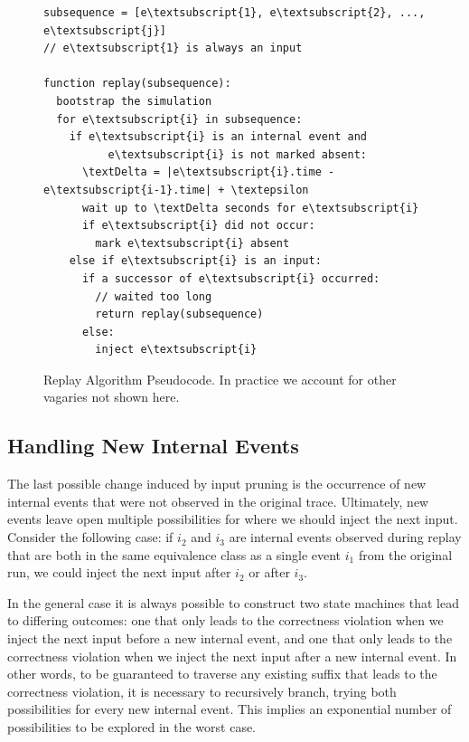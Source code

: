 \begin{figure}
\begin{boxedminipage}{\linewidth}
\begin{Verbatim}[commandchars=\\\{\}]
subsequence = [e\textsubscript{1}, e\textsubscript{2}, ..., e\textsubscript{j}]
// e\textsubscript{1} is always an input

function replay(subsequence):
  bootstrap the simulation
  for e\textsubscript{i} in subsequence:
    if e\textsubscript{i} is an internal event and
          e\textsubscript{i} is not marked absent:
      \textDelta = |e\textsubscript{i}.time - e\textsubscript{i-1}.time| + \textepsilon
      wait up to \textDelta seconds for e\textsubscript{i}
      if e\textsubscript{i} did not occur:
        mark e\textsubscript{i} absent
    else if e\textsubscript{i} is an input:
      if a successor of e\textsubscript{i} occurred:
        // waited too long
        return replay(subsequence)
      else:
        inject e\textsubscript{i}
\end{Verbatim}
\end{boxedminipage}
\caption{Replay Algorithm Pseudocode. In practice we account for other
vagaries not shown here. }
\label{fig:peek}
\end{figure}

\subsection{Handling New Internal Events}
\label{subsec:new_events}

The last possible change induced by input pruning is the occurrence of new
internal events that were not observed in the original trace.
Ultimately, new events leave open multiple possibilities for where
we should inject the next input. Consider the following case:
if $i_2$ and $i_3$ are internal events observed
during replay that are both in the same equivalence class as a single event $i_1$ from the
original run, we could inject the next input after $i_2$ or after $i_3$.


In the general case it is always possible to construct two state machines that lead
to differing outcomes: one that only leads to the correctness violation when
we inject the next input
before a new internal event, and one that only leads to the
correctness violation when we inject the next input after a new internal
event. In other words, to be guaranteed to traverse any existing suffix that leads
to the correctness violation, it is necessary to recursively branch, trying both
possibilities for every new internal event. This implies an exponential number of
possibilities to be explored in the worst case.

